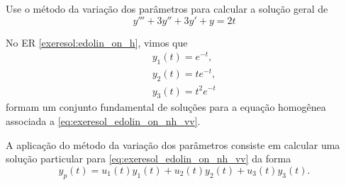 \begin{exeresol}
  Use o método da variação dos parâmetros para calcular a solução geral de
  \begin{equation}\label{eq:exeresol_edolin_on_nh_vv}
    y''' + 3y'' + 3y' + y = 2t
  \end{equation}
\end{exeresol}
\begin{resol}
  No ER \ref{exeresol:edolin_on_h}, vimos que
  \begin{align}
    y_1(t) = e^{-t},\\
    y_2(t) = te^{-t},\\
    y_3(t) = t^2e^{-t}
  \end{align}
  formam um conjunto fundamental de soluções para a equação homogênea associada a \eqref{eq:exeresol_edolin_on_nh_vv}.

  A aplicação do método da variação dos parâmetros consiste em calcular uma solução particular para \eqref{eq:exeresol_edolin_on_nh_vv} da forma 
  \begin{equation}
    y_p(t) = u_1(t)y_1(t)+u_2(t)y_2(t)+u_3(t)y_3(t).
  \end{equation}


\end{resol}
